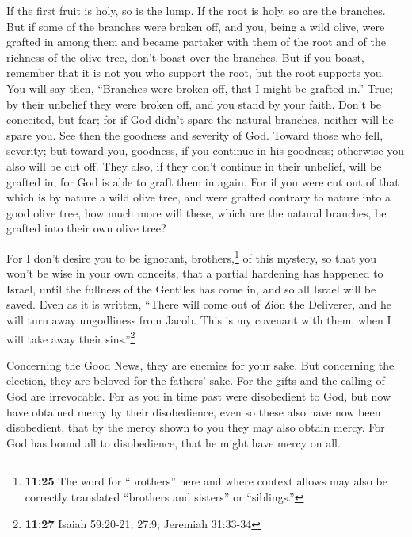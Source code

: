  If the first fruit is holy, so is the lump. If the root
is holy, so are the branches.  But if some of the
branches were broken off, and you, being a wild olive, were grafted in
among them and became partaker with them of the root and of the richness
of the olive tree,  don't boast over the branches. But if
you boast, remember that it is not you who support the root, but the
root supports you.  You will say then, ``Branches were
broken off, that I might be grafted in.''  True; by their
unbelief they were broken off, and you stand by your faith. Don't be
conceited, but fear;  for if God didn't spare the natural
branches, neither will he spare you.  See then the
goodness and severity of God. Toward those who fell, severity; but
toward you, goodness, if you continue in his goodness; otherwise you
also will be cut off.  They also, if they don't continue
in their unbelief, will be grafted in, for God is able to graft them in
again.  For if you were cut out of that which is by
nature a wild olive tree, and were grafted contrary to nature into a
good olive tree, how much more will these, which are the natural
branches, be grafted into their own olive tree?

 For I don't desire you to be ignorant,
brothers,\footnote{\textbf{11:25} The word for ``brothers'' here and
  where context allows may also be correctly translated ``brothers and
  sisters'' or ``siblings.''} of this mystery, so that you won't be wise
in your own conceits, that a partial hardening has happened to Israel,
until the fullness of the Gentiles has come in,  and so
all Israel will be saved. Even as it is written, ``There will come out
of Zion the Deliverer, and he will turn away ungodliness from Jacob.
 This is my covenant with them, when I will take away
their sins.''\footnote{\textbf{11:27} Isaiah 59:20-21; 27:9; Jeremiah
  31:33-34}

 Concerning the Good News, they are enemies for your
sake. But concerning the election, they are beloved for the fathers'
sake.  For the gifts and the calling of God are
irrevocable.  For as you in time past were disobedient to
God, but now have obtained mercy by their disobedience, 
even so these also have now been disobedient, that by the mercy shown to
you they may also obtain mercy.  For God has bound all to
disobedience, that he might have mercy on all.

